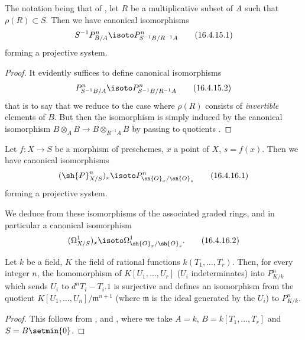 \begin{corollary}[16.4.15]
\label{IV.16.4.15}
The notation being that of , let $R$ be a multiplicative subset of $A$ such that $\rho(R) \subset S$.
Then we have canonical isomorphisms 
\[
  \label{IV.16.4.15.1}
  S^{-1}P_{B/A}^n \isoto P_{S^{-1}B/R^{-1}A}^n
  \tag{16.4.15.1}
\]
forming a projective system.
\end{corollary}

\begin{proof}
It evidently suffices to define canonical isomorphisms 
\[
  \label{IV.16.4.15.2}
  P_{S^{-1}B/A}^n \isoto P_{S^{-1}B/R^{-1}A}^n
  \tag{16.4.15.2}
\]
that is to say that we reduce to the case where $\rho(R)$ consists of \emph{invertible} elements of $B$.
But then the isomorphism  is simply induced by the canonical isomorphism $B \otimes_A B \to B \otimes_{R^{-1}A} B$ by passing to quotients .
\end{proof}

\begin{corollary}[16.4.16]
\label{IV.16.4.16}
Let $f:X \to S$ be a morphism of preschemes, $x$ a point of $X$, $s = f(x)$.
Then we have canonical isomorphisms
\[
  \label{IV.16.4.16.1}
  (\sh{P}_{X/S}^n)_x \isoto P_{\sh{O}_x/\sh{O}_s}^n
  \tag{16.4.16.1}
\]
forming a projective system.
\end{corollary}

We deduce from these isomorphisms of the associated graded rings, and in particular a canonical isomorphism
\[
  \label{IV.16.4.16.2}
  (\Omega_{X/S}^1)_x \isoto \Omega_{\sh{O}_x/\sh{O}_s}^1.
  \tag{16.4.16.2}
\]

\begin{corollary}[16.4.17]
\label{IV.16.4.17}
Let $k$ be a field, $K$ the field of rational functions $k(T_1, \dots, T_r)$.
Then, for every integer $n$, the homomorphism of $K[U_1, \dots, U_r]$ ($U_i$ indeterminates) into $P_{K/k}^n$ which sends $U_i$ to $d^nT_i - T_i.1$ is surjective and defines an isomorphism from the quotient $K[U_1, \dots, U_n]/\mathfrak{m}^{n+1}$  (where $\mathfrak{m}$ is the ideal generated by the $U_i$) to $P_{K/k}^n$.
\end{corollary}

\begin{proof}
This follows from ,   and , where we take $A = k$, $B = k[T_1, \dots, T_r]$ and $S = B \setmin \{0\}$.
\end{proof}

